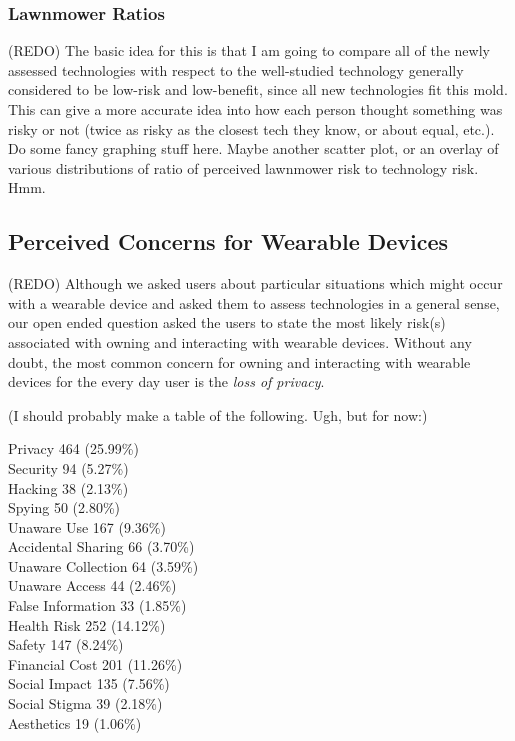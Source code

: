 \documentclass{acm_proc_article-sp}
\begin{document}
\subsubsection{Lawnmower Ratios} 
(REDO) The basic idea for this is that I am going to compare all of the newly assessed technologies with respect to the well-studied technology generally considered to be low-risk and low-benefit, since all new technologies fit this mold. This can give a more accurate idea into how each person thought something was risky or not (twice as risky as the closest tech they know, or about equal, etc.). Do some fancy graphing stuff here. Maybe another scatter plot, or an overlay of various distributions of ratio of perceived lawnmower risk to technology risk. Hmm. 

\subsection{Perceived Concerns for Wearable Devices}
(REDO) Although we asked users about particular situations which might occur with a wearable device and asked them to assess technologies in a general sense, our open ended question asked the users to state the most likely risk(s) associated with owning and interacting with wearable devices. Without any doubt, the most common concern for owning and interacting with wearable devices for the every day user is the \textit{loss of privacy}. 

(I should probably make a table of the following. Ugh, but for now:)

Privacy 				464 (25.99\%) \\
Security 				94 (5.27\%)\\
Hacking 				38 (2.13\%)\\
Spying 				50 (2.80\%)\\ [-.5cm]

Unaware Use 			167 (9.36\%)\\
Accidental Sharing 		66 (3.70\%)\\
Unaware Collection		64 (3.59\%)\\
Unaware Access	 	44 (2.46\%)\\
False Information 		33 (1.85\%)\\[-.5cm]

Health Risk 			252 (14.12\%)\\
Safety 				147 (8.24\%)\\
Financial Cost	 		201 (11.26\%)\\[-.5cm]

Social Impact 			135 (7.56\%)\\
Social Stigma 			39 (2.18\%)\\
Aesthetics 			19 (1.06\%)\\[-.5cm]
\end{document}
